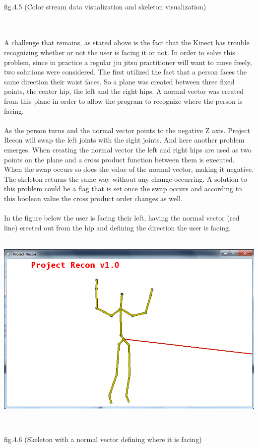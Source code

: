 \\
\centerline{fig.4.5 (Color stream data visualization and skeleton visualization)}
\\
\\
A challenge that remains, as stated above is the fact that the Kinect has trouble recognizing whether or not the user is facing it or not. In order to solve this problem, since in practice a regular jiu jitsu practitioner will want to move freely, two solutions were considered. The first utilized the fact that a person faces the same direction their waist faces. So a plane was created between three fixed points, the center hip, the left and the right hips. A normal vector was created from this plane in order to allow the program to recognize where the person is facing.
\\
\\
As the person turns and the normal vector points to the negative Z axis. Project Recon will swap the left joints with the right joints. And here another problem emerges. When creating the normal vector the left and right hips are used as two points on the plane and a cross product function between them is executed. When the swap occurs so does the value of the normal vector, making it negative. The skeleton returns the same way without any change occurring. A solution to this problem could be a flag that is set once the swap occurs and according to this boolean value the cross product order changes as well.
\\
\\
In the figure below the user is facing their left, having the normal vector (red line) erected out from the hip and defining the direction the user is facing.
\\
\\
\centerline{\includegraphics[scale=0.5]{skeleton_normal.png}}
\\
\centerline{fig.4.6 (Skeleton with a normal vector defining where it is facing)}
\\
\\

